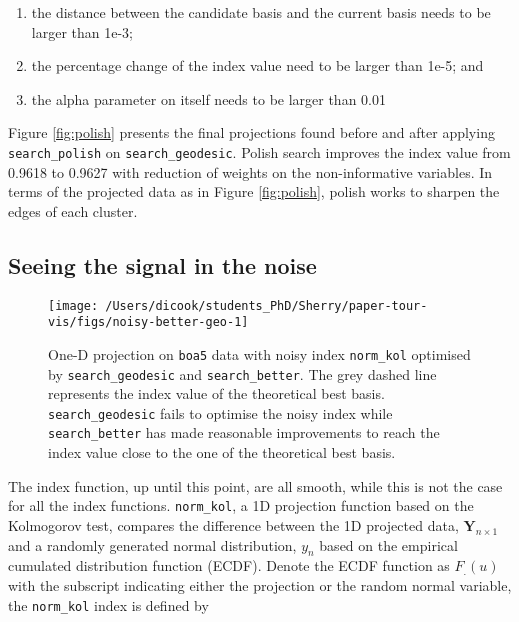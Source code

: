\documentclass[12pt]{article}
\providecommand{\tightlist}{%
  \setlength{\itemsep}{0pt}\setlength{\parskip}{0pt}}
\begin{document}
\begin{enumerate}
\def\labelenumi{\arabic{enumi})}
\tightlist
\item
  the distance between the candidate basis and the current basis needs to be larger than 1e-3;
\item
  the percentage change of the index value need to be larger than 1e-5; and
\item
  the alpha parameter on itself needs to be larger than 0.01
\end{enumerate}

Figure \ref{fig:polish} presents the final projections found before and after applying \texttt{search\_polish} on \texttt{search\_geodesic}. Polish search improves the index value from 0.9618 to 0.9627 with reduction of weights on the non-informative variables. In terms of the projected data as in Figure \ref{fig:polish}, polish works to sharpen the edges of each cluster.

\hypertarget{seeing-the-signal-in-the-noise}{%
\subsection{Seeing the signal in the noise}\label{seeing-the-signal-in-the-noise}}

\begin{figure}

{\centering \texttt{[image: /Users/dicook/students\_PhD/Sherry/paper-tour-vis/figs/noisy-better-geo-1]} 

}

\caption{One-D projection on \texttt{boa5} data with noisy index \texttt{norm\_kol} optimised by \texttt{search\_geodesic} and \texttt{search\_better}. The grey dashed line represents the index value of the theoretical best basis. \texttt{search\_geodesic} fails to optimise the noisy index while \texttt{search\_better} has made reasonable improvements to reach the index value close to the one of the theoretical best basis.}\label{fig:noisy-better-geo}
\end{figure}



The index function, up until this point, are all smooth, while this is not the case for all the index functions. \texttt{norm\_kol}, a 1D projection function based on the Kolmogorov test, compares the difference between the 1D projected data, \(\mathbf{Y}_{n \times 1}\) and a randomly generated normal distribution, \(y_n\) based on the empirical cumulated distribution function (ECDF). Denote the ECDF function as \(F_{.}(u)\) with the subscript indicating either the projection or the random normal variable, the \texttt{norm\_kol} index is defined by
\end{document}
